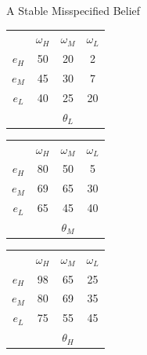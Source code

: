 \documentclass[aspectratio=169]{beamer}
\begin{document}
\begin{frame}{A Stable Misspecified Belief}

\centering
\begin{tabular}{ c|c|c|c|}
  
  \multicolumn{1}{c}{} & \multicolumn{1}{c}{$\omega_H$} & \multicolumn{1}{c}{$\omega_M$} & \multicolumn{1}{c}{$\omega_L$}\\
  \cline{2-4}
  $e_H$ & \cellcolor[HTML]{b84f79}50 & 20 & 2 \\
  \cline{2-4}
  $e_M$ & 45 & 30 & 7 \\
  \cline{2-4}
  $e_L$ & 40 & 25 & 20 \\
  \cline{2-4}
  \multicolumn{1}{c}{} & \multicolumn{1}{c}{} & \multicolumn{1}{c}{$\theta_L$} & \multicolumn{1}{c}{}\\
\end{tabular}
\hspace{.3cm} %
\begin{tabular}{ c|c|c|c|}
  
  \multicolumn{1}{c}{} & \multicolumn{1}{c}{$\omega_H$} & \multicolumn{1}{c}{$\omega_M$} & \multicolumn{1}{c}{$\omega_L$}\\
  \cline{2-4}
  $e_H$ & 80 & \cellcolor[HTML]{b84f79}50 & 5 \\
  \cline{2-4}
  $e_M$ & 69 &\cellcolor[HTML]{f09ebe}65 & 30 \\
  \cline{2-4}
  $e_L$ & 65 & \cellcolor[HTML]{f09ebe}45 & 40 \\
  \cline{2-4}
  \multicolumn{1}{c}{} & \multicolumn{1}{c}{} & \multicolumn{1}{c}{$\theta_M$} & \multicolumn{1}{c}{}\\
\end{tabular}
\hspace{.3cm} %
\begin{tabular}{ c|c|c|c|}
  
  \multicolumn{1}{c}{} & \multicolumn{1}{c}{$\omega_H$} & \multicolumn{1}{c}{$\omega_M$} & \multicolumn{1}{c}{$\omega_L$}\\
  \cline{2-4}
  $e_H$ & 98 & 65 & 25 \\
  \cline{2-4}
  $e_M$ & 80 & 69 & 35 \\
  \cline{2-4}
  $e_L$ & 75 & 55 & 45 \\
  \cline{2-4}
  \multicolumn{1}{c}{} & \multicolumn{1}{c}{} & \multicolumn{1}{c}{$\theta_H$} & \multicolumn{1}{c}{}\\
\end{tabular}
\end{frame}
\end{document}
